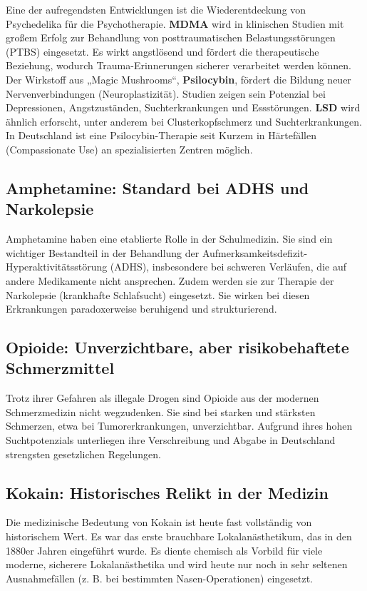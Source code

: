 \documentclass[11pt,a4paper]{article}
\begin{document}
	Eine der aufregendsten Entwicklungen ist die Wiederentdeckung von Psychedelika für die Psychotherapie. \textbf{MDMA} wird in klinischen Studien mit großem Erfolg zur Behandlung von posttraumatischen Belastungsstörungen (PTBS) eingesetzt. Es wirkt angstlösend und fördert die therapeutische Beziehung, wodurch Trauma-Erinnerungen sicherer verarbeitet werden können. \cite{mdma-ptsd} Der Wirkstoff aus „Magic Mushrooms“, \textbf{Psilocybin}, fördert die Bildung neuer Nervenverbindungen (Neuroplastizität). Studien zeigen sein Potenzial bei Depressionen, Angstzuständen, Suchterkrankungen und Essstörungen. \textbf{LSD} wird ähnlich erforscht, unter anderem bei Clusterkopfschmerz und Suchterkrankungen. In Deutschland ist eine Psilocybin-Therapie seit Kurzem in Härtefällen (Compassionate Use) an spezialisierten Zentren möglich.\cite{psychedelics}
	
	\subsection{Amphetamine: Standard bei ADHS und Narkolepsie}
	
	Amphetamine haben eine etablierte Rolle in der Schulmedizin. Sie sind ein wichtiger Bestandteil in der Behandlung der Aufmerksamkeitsdefizit-Hyperaktivitätsstörung (ADHS), insbesondere bei schweren Verläufen, die auf andere Medikamente nicht ansprechen. Zudem werden sie zur Therapie der Narkolepsie (krankhafte Schlafsucht) eingesetzt. Sie wirken bei diesen Erkrankungen paradoxerweise beruhigend und strukturierend.\cite{amphetamine-adhd}
	
	\subsection{Opioide: Unverzichtbare, aber risikobehaftete Schmerzmittel}
	
	Trotz ihrer Gefahren als illegale Drogen sind Opioide aus der modernen Schmerzmedizin nicht wegzudenken. Sie sind bei starken und stärksten Schmerzen, etwa bei Tumorerkrankungen, unverzichtbar. Aufgrund ihres hohen Suchtpotenzials unterliegen ihre Verschreibung und Abgabe in Deutschland strengsten gesetzlichen Regelungen.\cite{opioid-pain}
	
	\subsection{Kokain: Historisches Relikt in der Medizin}
	
	Die medizinische Bedeutung von Kokain ist heute fast vollständig von historischem Wert. Es war das erste brauchbare Lokalanästhetikum, das in den 1880er Jahren eingeführt wurde. Es diente chemisch als Vorbild für viele moderne, sicherere Lokalanästhetika und wird heute nur noch in sehr seltenen Ausnahmefällen (z. B. bei bestimmten Nasen-Operationen) eingesetzt.\cite{cocaine-medical}
	
\end{document}
